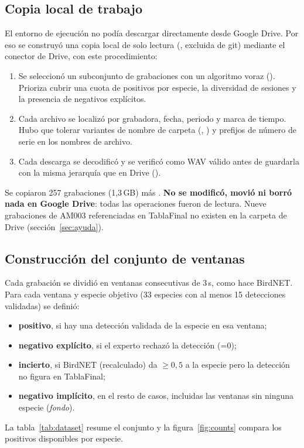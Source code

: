 \documentclass[11pt,a4paper]{article}
\begin{document}
\subsection{Copia local de trabajo}
El entorno de ejecución no podía descargar directamente desde Google Drive. Por eso se construyó una copia local de solo lectura
(, excluida de git) mediante el conector de Drive, con este procedimiento:
\begin{enumerate}
  \item Se seleccionó un subconjunto de grabaciones con un algoritmo voraz (). Prioriza cubrir una cuota de
        positivos por especie, la diversidad de sesiones y la presencia de negativos explícitos.
  \item Cada archivo se localizó por grabadora, fecha, periodo y marca de tiempo. Hubo que tolerar variantes de nombre de carpeta (, )
        y prefijos de número de serie en los nombres de archivo.
  \item Cada descarga se decodificó y se verificó como WAV válido antes de guardarla con la misma jerarquía que en Drive ().
\end{enumerate}
Se copiaron 257 grabaciones (1,3\,GB) más . \textbf{No se modificó, movió ni borró nada en Google Drive}: todas las operaciones fueron de lectura.
Nueve grabaciones de AM003 referenciadas en TablaFinal no existen en la carpeta de Drive (sección~\ref{sec:ayuda}).

\subsection{Construcción del conjunto de ventanas}
Cada grabación se dividió en ventanas consecutivas de 3\,s, como hace BirdNET. Para cada ventana y especie objetivo
(33 especies con al menos 15 detecciones validadas) se definió:
\begin{itemize}
  \item \textbf{positivo}, si hay una detección validada de la especie en esa ventana;
  \item \textbf{negativo explícito}, si el experto rechazó la detección (=0);
  \item \textbf{incierto}, si BirdNET (recalculado) da $\geq 0{,}5$ a la especie pero la detección no figura en TablaFinal;
  \item \textbf{negativo implícito}, en el resto de casos, incluidas las ventanas sin ninguna especie (\emph{fondo}).
\end{itemize}
La tabla~\ref{tab:dataset} resume el conjunto y la figura~\ref{fig:counts} compara los positivos disponibles por especie.
\end{document}

